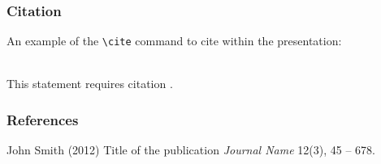 \documentclass{beamer}
\begin{document}

\begin{frame}[fragile] %
\frametitle{Citation}
An example of the \verb|\cite| command to cite within the presentation:\\~

This statement requires citation \cite{p1}.
\end{frame}


\begin{frame}
\frametitle{References}
\footnotesize{
\begin{thebibliography}{99} %
 John Smith (2012)
\newblock Title of the publication
\newblock \emph{Journal Name} 12(3), 45 -- 678.
\end{thebibliography}
}
\end{frame}


\end{document}
